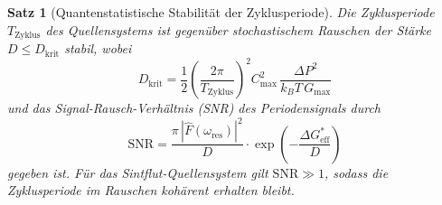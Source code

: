 ﻿\documentclass[12pt,a4paper]{report}
\newtheorem{theorem}{Satz}[chapter]
\begin{document}
\begin{theorem}[Quantenstatistische Stabilität der Zyklusperiode]
	\label{thm:stochres}
	Die Zyklusperiode $T_\mathrm{Zyklus}$ des Quellensystems ist gegenüber stochastischem Rauschen der Stärke $D \leq D_\mathrm{krit}$ stabil, wobei
	\begin{equation}
		D_\mathrm{krit} = \frac{1}{2}\left(\frac{2\pi}{T_\mathrm{Zyklus}}\right)^2 C_\mathrm{max}^2\,\frac{\Delta P^2}{k_BT\,G_\mathrm{max}}
		\label{eq:D_krit}
	\end{equation}
	und das Signal-Rausch-Verhältnis (SNR) des Periodensignals durch
	\begin{equation}
		\mathrm{SNR} = \frac{\pi\,|\hat{F}(\omega_\mathrm{res})|^2}{D} \cdot \exp\!\left(-\frac{\Delta G^*_\mathrm{eff}}{D}\right)
		\label{eq:snr}
	\end{equation}
	gegeben ist. Für das Sintflut-Quellensystem gilt $\mathrm{SNR} \gg 1$, sodass die Zyklusperiode im Rauschen kohärent erhalten bleibt.
\end{theorem}
\end{document}
